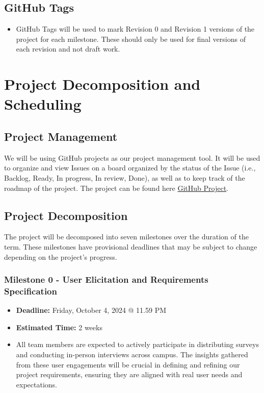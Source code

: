 \documentclass{article}
\begin{document}
\subsection{GitHub Tags}
\begin{itemize}
    \item GitHub Tags will be used to mark Revision 0 and Revision 1 versions of the project for each milestone. These should only be used for final versions of each revision and not draft work.
\end{itemize}

\newpage

\section{Project Decomposition and Scheduling}

\subsection{Project Management}
We will be using GitHub projects as our project management tool. It will be used to organize and view Issues on a board organized by the status of the Issue (i.e., Backlog, Ready, In progress, In review, Done), as well as to keep track of the roadmap of the project. The project can be found here \href{https://github.com/orgs/PlutosCapstone/projects/1/views/1}{GitHub Project}.

\subsection{Project Decomposition}
The project will be decomposed into seven milestones over the duration of the term. These milestones have provisional deadlines that may be subject to change depending on the project's progress.

\subsubsection*{Milestone 0 - User Elicitation and Requirements Specification}
\begin{itemize}
    \item \textbf{Deadline:} Friday, October 4, 2024 @ 11.59 PM
    \item \textbf{Estimated Time:} 2 weeks
    \item All team members are expected to actively participate in distributing surveys and conducting in-person interviews across campus. The insights gathered from these user engagements will be crucial in defining and refining our project requirements, ensuring they are aligned with real user needs and expectations.
\end{itemize}
\end{document}
